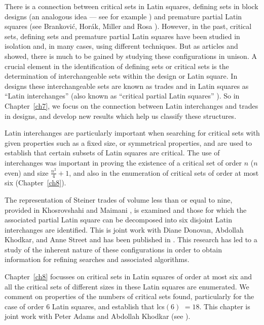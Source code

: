 \documentclass[12pt]{report}
\def\lcs#1{{\rm lcs}$(#1)$}
\begin{document}
There is a connection between critical sets in Latin squares,
defining sets in block designs (an analogous idea --- see for example
\cite{MR93c:05026}) and premature partial Latin squares (see Brankovi{\'c},
Hor{\'a}k, Miller and Rosa {\cite{mirka1}}).  However, in the past, critical
sets, defining sets and premature partial Latin squares have been studied
in isolation and, in many cases,  using different techniques.  But as
articles \cite{dks1} and \cite{dks2} showed, there is much to be gained
by studying these configurations in unison. A crucial element in the
identification of defining sets or critical sets is the determination of
interchangeable sets within the design or Latin square.  In designs
these interchangeable sets are known as trades and in Latin squares
as ``Latin interchanges'' (also known as ``critical partial Latin squares''
\cite{MR96a:05027,MR98b:05019}).  So in Chapter~\ref{ch7}, we focus on the
connection between Latin interchanges and trades in designs, and develop
new results which help us classify these structures.

Latin interchanges are particularly important when searching for critical sets
with given properties such as a fixed size, or symmetrical properties,
and are used to establish that certain subsets of Latin squares are critical.
The use of interchanges was important in proving the existence of a
critical set of order $n$ ($n$ even) and size $\displaystyle{\frac{n^2}{4}} + 1$, and
also in the enumeration of critical sets of order at most six (Chapter~\ref{ch8}).

The representation of Steiner trades of volume less than or equal to
nine, provided in Khosrovshahi and Maimani \cite{MR2000g:05030}, is
examined and those for which the associated partial Latin square can be
decomposed into six disjoint Latin interchanges are identified.  This is
joint work with Diane Donovan, Abdollah Khodkar, and Anne Street and has
been published in \cite{me2}.  This research has led to a study of the
inherent nature of these configurations in order to obtain information
for refining  searches and associated algorithms.

Chapter~\ref{ch8} focusses on critical sets in Latin squares of order at most six and all the
critical sets of different sizes in these Latin squares 
are enumerated.  We comment on properties of the numbers of critical
sets found, particularly for the case of order 6 Latin squares, and
establish that \lcs{6} $= 18$.  This chapter is joint work with Peter
Adams and Abdollah Khodkar (see \cite{abk}).
\end{document}
